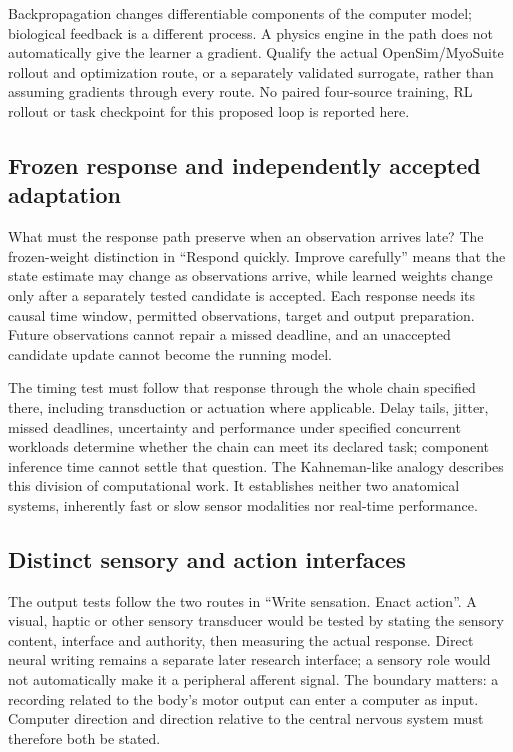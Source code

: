 Backpropagation changes differentiable components of the computer model;
biological feedback is a different process. A physics engine in the path does
not automatically give the learner a gradient. Qualify the actual
OpenSim/MyoSuite rollout and optimization route, or a separately validated
surrogate, rather than assuming gradients through every route. No paired four-source training,
RL rollout or task checkpoint for this proposed loop is reported here.

\subsection{Frozen response and independently accepted adaptation}

What must the response path preserve when an observation arrives late? The frozen-weight distinction in ``Respond quickly. Improve carefully'' means that the state estimate may change as observations arrive, while learned weights change only after a separately tested candidate is accepted. Each response needs its causal time window, permitted observations, target and output preparation. Future observations cannot repair a missed deadline, and an unaccepted candidate update cannot become the running model.

The timing test must follow that response through the whole chain specified there, including transduction or actuation where applicable. Delay tails, jitter, missed deadlines, uncertainty and performance under specified concurrent workloads determine whether the chain can meet its declared task; component inference time cannot settle that question. The Kahneman-like analogy describes this division of computational work. It establishes neither two anatomical systems, inherently fast or slow sensor modalities nor real-time performance.

\subsection{Distinct sensory and action interfaces}

The output tests follow the two routes in ``Write sensation. Enact action''. A visual, haptic or other sensory transducer would be tested by stating the sensory content, interface and authority, then measuring the actual response. Direct neural writing remains a separate later research interface; a sensory role would not automatically make it a peripheral afferent signal. The boundary matters: a recording related to the body's motor output can enter a computer as input. Computer direction and direction relative to the central nervous system must therefore both be stated.


